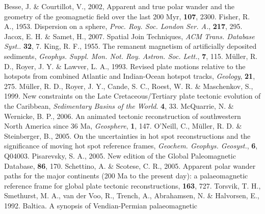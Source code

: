 \begin{thebibliography}{}
  Besse, J. \& Courtillot, V., 2002, Apparent and true polar wander and the
  geometry of the geomagnetic field over the last 200 Myr, \jgr{}\textbf{107},
  2300.
  Fisher, R. A., 1953. Dispersion on a sphere, \textit{Proc. Roy. Soc. London
  Ser. A.}, \textbf{217}, 295.
  Jacox, E. H. \& Samet, H., 2007. Spatial Join Techniques, \textit{ACM Trans.
  Database Syst.}. \textbf{32}, 7.
  King, R. F., 1955. The remanent magnetism of artificially deposited sediments,
  \textit{Geophys. Suppl. Mon. Not. Roy. Astron. Soc. Lett.}, \textbf{7},
  115.
  M{\"{u}}ller, R. D., Royer, J. Y. \& Lawver, L. A., 1993. Revised plate
  motions relative to the hotspots from combined Atlantic and Indian-Ocean
  hotspot tracks, \textit{Geology}, \textbf{21}, 275.
  M{\"{u}}ller, R. D., Royer, J. Y., Cande, S. C., Roest, W. R. \& Maschenkov,
  S., 1999. New constraints on the Late Cretaceous/Tertiary plate tectonic
  evolution of the Caribbean, \textit{Sedimentary Basins of the World}.
  \textbf{4}, 33.
  McQuarrie, N. \& Wernicke, B. P., 2006. An animated tectonic reconstruction of
  southwestern North America since 36 Ma, \textit{Geosphere}, \textbf{1},
  147.
  O'Neill, C., M{\"{u}}ller, R. D. \& Steinberger, B., 2005. On the
  uncertainties in hot spot reconstructions and the significance of moving hot
  spot reference frames, \textit{Geochem. Geophys. Geosyst.}, \textbf{6},
  Q04003.
  Pisarevsky, S. A., 2005. New edition of the Global Paleomagnetic Database,
  \eos{}\textbf{86}, 170.
  Schettino, A. \& Scotese, C. R., 2005. Apparent polar wander paths for the
  major continents (200 Ma to the present day): a palaeomagnetic reference frame
  for global plate tectonic reconstructions, \gji{}\textbf{163},
  727.
  Torsvik, T. H., Smethurst, M. A., van der Voo, R., Trench, A., Abrahamsen, N.
  \& Halvorsen, E., 1992. Baltica. A synopsis of Vendian-Permian palaeomagnetic

\end{thebibliography}
